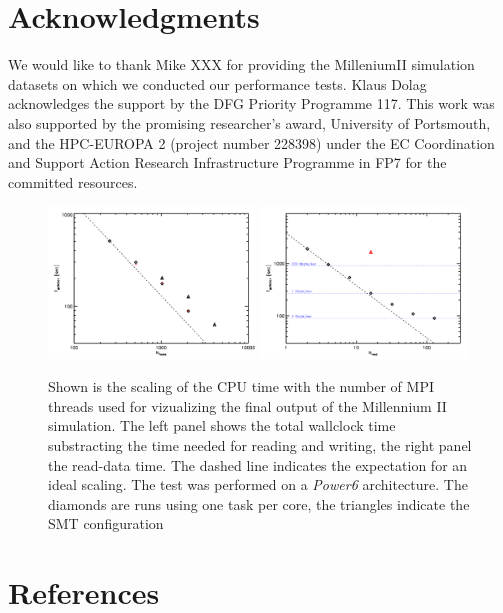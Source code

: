 \section*{Acknowledgments}
We would like to thank Mike XXX for providing the MilleniumII simulation datasets 
on which we conducted our performance tests. Klaus Dolag acknowledges the support 
by the DFG Priority Programme 117. This work was also supported by the promising 
researcher's award, University of Portsmouth, and the HPC-EUROPA 2 (project number 228398) 
under the EC Coordination and Support Action Research Infrastructure Programme in FP7 
for the committed resources.

\begin{figure}
\begin{center}
\includegraphics[width=0.49\textwidth]{t_cpu.pdf}
\includegraphics[width=0.49\textwidth]{t_read.pdf}
\end{center}
\caption{Shown is the scaling of the CPU time with the number of MPI threads used 
for vizualizing the
final output of the Millennium II simulation. 
The left panel shows the total wallclock time substracting the time needed for 
reading and writing, the right panel the read-data time. 
The dashed line indicates the expectation for an ideal scaling. The test was 
performed on a {\it Power6} architecture. The diamonds are runs using one task per core, 
the triangles indicate the SMT configuration
}\label{cpu_scaling}
\end{figure}

\section*{References}


